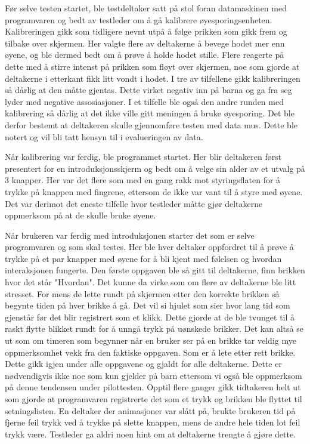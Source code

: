  
Før selve testen startet, ble testdeltaker satt på stol foran datamaskinen med programvaren og bedt av testleder om å gå kalibrere øyesporingsenheten. Kalibreringen gikk som tidligere nevnt utpå å følge prikken som gikk frem og tilbake over skjermen. Her valgte flere av deltakerne å bevege hodet mer enn øyene, og ble dermed bedt om å prøve å holde hodet stille. Flere reagerte på dette med å stirre intenst på prikken som fløyt over skjermen, noe som gjorde at deltakerne i etterkant fikk litt vondt i hodet. I tre av tilfellene gikk kalibreringen så dårlig at den måtte gjentas. Dette virket negativ inn på barna og ga fra seg lyder med negative assosiasjoner. I et tilfelle ble også den andre runden med kalibrering så dårlig at det ikke ville gitt meningen å bruke øyesporing. Det ble derfor bestemt at deltakeren skulle gjennomføre testen med data mus. Dette ble notert og vil bli tatt hensyn til i evalueringen av data. 
 
 
Når kalibrering var ferdig, ble programmet startet. Her blir deltakeren først presentert for en introduksjonsskjerm og  bedt om å velge sin alder av et utvalg på 3 knapper. Her var det flere som med en gang rakk mot styringsflaten for å trykke på knappen med fingrene, ettersom de ikke var vant til å styre med øyene. Det var derimot det eneste tilfelle hvor testleder måtte gjør deltakerne oppmerksom på at de skulle bruke øyene. 
 
 
Når brukeren var ferdig med introduksjonen starter det som er selve programvaren og som skal testes. Her ble hver deltaker oppfordret til  å prøve å trykke på et par knapper med øyene for å bli kjent med følelsen og hvordan interaksjonen fungerte. Den første oppgaven ble så gitt til deltakerne, finn brikken hvor det står "Hvordan". Det kunne da virke som om flere av deltakerne ble litt stresset. For mens de lette rundt på skjermen etter den korrekte brikken så begynte tiden på hver brikke å gå. Det vil si hjulet som sier hvor lang tid som gjenstår før det blir registrert som et klikk. Dette gjorde at de ble tvunget til å raskt flytte blikket rundt for å unngå trykk på uønskede brikker. Det kan altså se ut som om timeren som begynner når en bruker ser på en brikke tar veldig mye oppmerksomhet vekk fra den faktiske oppgaven. Som er å lete etter rett brikke. Dette gikk igjen under alle oppgavene og gjaldt for alle deltakerne. Dette er nødvendigvis ikke noe som kun gjelder på barn ettersom vi også ble oppmerksom på denne tendensen under pilottesten. Opptil flere ganger gikk tidtakeren helt ut som gjorde at programvaren registrerte det som et trykk og brikken ble flyttet til setningslisten. En deltaker  der animasjoner var slått på, brukte brukeren tid på fjerne feil trykk ved å trykke på slette knappen, mens de andre hele tiden lot feil trykk være. Testleder ga aldri noen hint om at deltakerne trengte å gjøre dette.  
 
